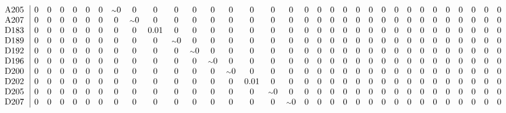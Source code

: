 \begin{table}[H]
\begin{center}
\begin{math}
\begin{array}{c|cccccccccccccccccccccccccccccccc}
\mathrm{A205} \hspace*{2pt} &  0 &  0 &  0 &  0 &  0 &  0 &  {\scriptstyle \sim }0 &  0 &  0 &  0 &  0 &  0 &  0 &  0 &  0 &  0 &  0 &  0 &  0 &  0 &  0 &  0 &  0 &  0 &  0 &  0 &  0 &  0 &  0 &  0 &  0 &  0 \\
\mathrm{A207} \hspace*{2pt} &  0 &  0 &  0 &  0 &  0 &  0 &  0 &  {\scriptstyle \sim }0 &  0 &  0 &  0 &  0 &  0 &  0 &  0 &  0 &  0 &  0 &  0 &  0 &  0 &  0 &  0 &  0 &  0 &  0 &  0 &  0 &  0 &  0 &  0 &  0 \\
\mathrm{D183} \hspace*{2pt} &  0 &  0 &  0 &  0 &  0 &  0 &  0 &  0 &       0.01 &  0 &  0 &  0 &  0 &  0 &  0 &  0 &  0 &  0 &  0 &  0 &  0 &  0 &  0 &  0 &  0 &  0 &  0 &  0 &  0 &  0 &  0 &  0 \\
\mathrm{D189} \hspace*{2pt} &  0 &  0 &  0 &  0 &  0 &  0 &  0 &  0 &  0 &  {\scriptstyle \sim }0 &  0 &  0 &  0 &  0 &  0 &  0 &  0 &  0 &  0 &  0 &  0 &  0 &  0 &  0 &  0 &  0 &  0 &  0 &  0 &  0 &  0 &  0 \\
\mathrm{D192} \hspace*{2pt} &  0 &  0 &  0 &  0 &  0 &  0 &  0 &  0 &  0 &  0 &  {\scriptstyle \sim }0 &  0 &  0 &  0 &  0 &  0 &  0 &  0 &  0 &  0 &  0 &  0 &  0 &  0 &  0 &  0 &  0 &  0 &  0 &  0 &  0 &  0 \\
\mathrm{D196} \hspace*{2pt} &  0 &  0 &  0 &  0 &  0 &  0 &  0 &  0 &  0 &  0 &  0 &  {\scriptstyle \sim }0 &  0 &  0 &  0 &  0 &  0 &  0 &  0 &  0 &  0 &  0 &  0 &  0 &  0 &  0 &  0 &  0 &  0 &  0 &  0 &  0 \\
\mathrm{D200} \hspace*{2pt} &  0 &  0 &  0 &  0 &  0 &  0 &  0 &  0 &  0 &  0 &  0 &  0 &  {\scriptstyle \sim }0 &  0 &  0 &  0 &  0 &  0 &  0 &  0 &  0 &  0 &  0 &  0 &  0 &  0 &  0 &  0 &  0 &  0 &  0 &  0 \\
\mathrm{D202} \hspace*{2pt} &  0 &  0 &  0 &  0 &  0 &  0 &  0 &  0 &  0 &  0 &  0 &  0 &  0 &       0.01 &  0 &  0 &  0 &  0 &  0 &  0 &  0 &  0 &  0 &  0 &  0 &  0 &  0 &  0 &  0 &  0 &  0 &  0 \\
\mathrm{D205} \hspace*{2pt} &  0 &  0 &  0 &  0 &  0 &  0 &  0 &  0 &  0 &  0 &  0 &  0 &  0 &  0 &  {\scriptstyle \sim }0 &  0 &  0 &  0 &  0 &  0 &  0 &  0 &  0 &  0 &  0 &  0 &  0 &  0 &  0 &  0 &  0 &  0 \\
\mathrm{D207} \hspace*{2pt} &  0 &  0 &  0 &  0 &  0 &  0 &  0 &  0 &  0 &  0 &  0 &  0 &  0 &  0 &  0 &  {\scriptstyle \sim }0 &  0 &  0 &  0 &  0 &  0 &  0 &  0 &  0 &  0 &  0 &  0 &  0 &  0 &  0 &  0 &  0 \\

\end{array}
\end{math}
\end{center}
\end{table}
